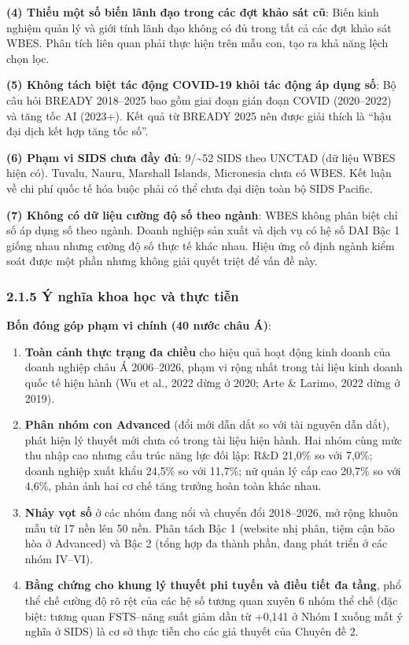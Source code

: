 \documentclass[
  a4paper,
  13pt]{extreport}
\begin{document}
\textbf{(4) Thiếu một số biến lãnh đạo trong các đợt khảo sát cũ}: Biến
kinh nghiệm quản lý và giới tính lãnh đạo không có đủ trong tất cả các
đợt khảo sát WBES. Phân tích liên quan phải thực hiện trên mẫu con, tạo
ra khả năng lệch chọn lọc.

\textbf{(5) Không tách biệt tác động COVID-19 khỏi tác động áp dụng số}:
Bộ câu hỏi BREADY 2018--2025 bao gồm giai đoạn gián đoạn COVID
(2020--2022) và tăng tốc AI (2023+). Kết quả từ BREADY 2025 nên được
giải thích là ``hậu đại dịch kết hợp tăng tốc số''.

\textbf{(6) Phạm vi SIDS chưa đầy đủ}: 9/\textasciitilde52 SIDS theo
UNCTAD (dữ liệu WBES hiện có). Tuvalu, Nauru, Marshall Islands,
Micronesia chưa có WBES. Kết luận về chi phí quốc tế hóa buộc phải có
thể chưa đại diện toàn bộ SIDS Pacific.

\textbf{(7) Không có dữ liệu cường độ số theo ngành}: WBES không phân
biệt chỉ số áp dụng số theo ngành. Doanh nghiệp sản xuất và dịch vụ có
hệ số DAI Bậc 1 giống nhau nhưng cường độ số thực tế khác nhau. Hiệu ứng
cố định ngành kiểm soát được một phần nhưng không giải quyết triệt để
vấn đề này.

\hypertarget{uxfd-nghux129a-khoa-hux1ecdc-vuxe0-thux1ef1c-tiux1ec5n}{%
\subsubsection{2.1.5 Ý nghĩa khoa học và thực
tiễn}\label{uxfd-nghux129a-khoa-hux1ecdc-vuxe0-thux1ef1c-tiux1ec5n}}

\textbf{Bốn đóng góp phạm vi chính (40 nước châu Á)}:

\begin{enumerate}
\def\labelenumi{(\arabic{enumi})}
\item
  \textbf{Toàn cảnh thực trạng đa chiều} cho hiệu quả hoạt động kinh
  doanh của doanh nghiệp châu Á 2006--2026, phạm vi rộng nhất trong tài
  liệu kinh doanh quốc tế hiện hành (Wu et al., 2022 dừng ở 2020; Arte
  \& Larimo, 2022 dừng ở 2019).
\item
  \textbf{Phân nhóm con Advanced} (đổi mới dẫn dắt so với tài nguyên dẫn
  dắt), phát hiện lý thuyết mới chưa có trong tài liệu hiện hành. Hai
  nhóm cùng mức thu nhập cao nhưng cấu trúc năng lực đối lập: R\&D
  21,0\% so với 7,0\%; doanh nghiệp xuất khẩu 24,5\% so với 11,7\%; nữ
  quản lý cấp cao 20,7\% so với 4,6\%, phản ánh hai cơ chế tăng trưởng
  hoàn toàn khác nhau.
\item
  \textbf{Nhảy vọt số} ở các nhóm đang nổi và chuyển đổi 2018--2026, mở
  rộng khuôn mẫu từ 17 nền lên 50 nền. Phân tách Bậc 1 (website nhị
  phân, tiệm cận bão hòa ở Advanced) và Bậc 2 (tổng hợp đa thành phần,
  đang phát triển ở các nhóm IV--VI).
\item
  \textbf{Bằng chứng cho khung lý thuyết phi tuyến và điều tiết đa
  tầng}, phổ thể chế cường độ rõ rệt của các hệ số tương quan xuyên 6
  nhóm thể chế (đặc biệt: tương quan FSTS--năng suất giảm dần từ +0,141
  ở Nhóm I xuống mất ý nghĩa ở SIDS) là cơ sở thực tiễn cho các giả
  thuyết của Chuyên đề 2.
\end{enumerate}
\end{document}
